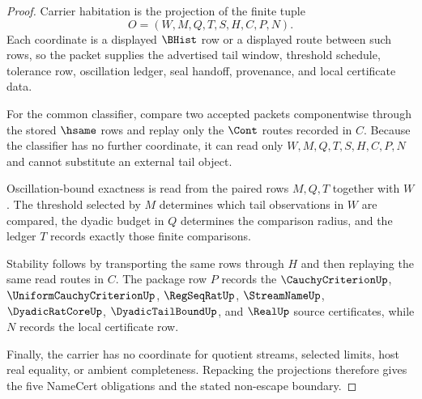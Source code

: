 \begin{proof}
Carrier habitation is the projection of the finite tuple
$$
O=(W,M,Q,T,S,H,C,P,N).
$$
Each coordinate is a displayed $\BHist$ row or a displayed route between such rows, so the packet supplies the advertised tail window, threshold schedule, tolerance row, oscillation ledger, seal handoff, provenance, and local certificate data.

For the common classifier, compare two accepted packets componentwise through the stored $\hsame$ rows and replay only the $\Cont$ routes recorded in $C$. Because the classifier has no further coordinate, it can read only $W,M,Q,T,S,H,C,P,N$ and cannot substitute an external tail object.

Oscillation-bound exactness is read from the paired rows $M,Q,T$ together with $W$. The threshold selected by $M$ determines which tail observations in $W$ are compared, the dyadic budget in $Q$ determines the comparison radius, and the ledger $T$ records exactly those finite comparisons.

Stability follows by transporting the same rows through $H$ and then replaying the same read routes in $C$. The package row $P$ records the $\CauchyCriterionUp$, $\UniformCauchyCriterionUp$, $\RegSeqRatUp$, $\StreamNameUp$, $\DyadicRatCoreUp$, $\DyadicTailBoundUp$, and $\RealUp$ source certificates, while $N$ records the local certificate row.

Finally, the carrier has no coordinate for quotient streams, selected limits, host real equality, or ambient completeness. Repacking the projections therefore gives the five NameCert obligations and the stated non-escape boundary.
\end{proof}


